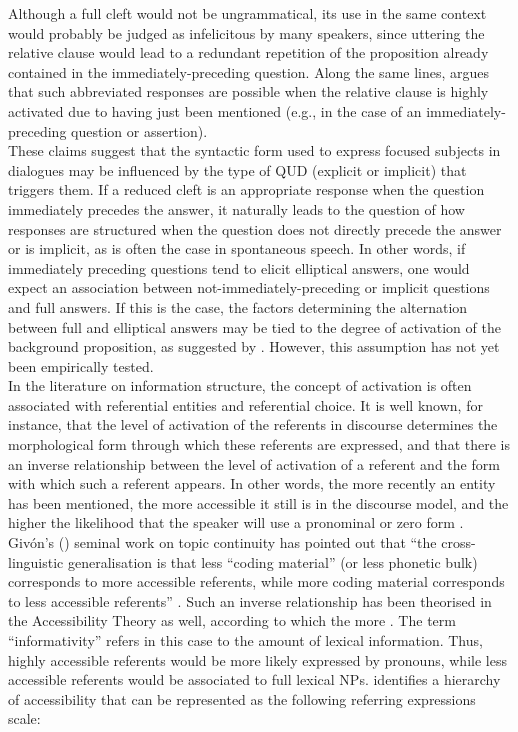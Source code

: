 Although a full cleft would not be ungrammatical, its use in the same context would probably be judged as infelicitous by many speakers, since uttering the relative clause would lead to a redundant repetition of the proposition already contained in the immediately-preceding question. Along the same lines, \textcite{katz2000categories} argues that such abbreviated responses are possible when the relative clause is highly activated due to having just been mentioned (e.g., in the case of an immediately-preceding question or assertion). \\
These claims suggest that the syntactic form used to express focused subjects in dialogues may be influenced by the type of QUD (explicit or implicit) that triggers them. If a reduced cleft is an appropriate response when the question immediately precedes the answer, it naturally leads to the question of how responses are structured when the question does not directly precede the answer or is implicit, as is often the case in spontaneous speech. In other words, if immediately preceding questions tend to elicit elliptical answers, one would expect an association between not-immediately-preceding or implicit questions and full answers.
If this is the case, the factors determining the alternation between full and elliptical answers may be tied to the degree of activation of the background proposition, as suggested by \textcite{katz2000categories}. However, this assumption has not yet been empirically tested. \\
 In the literature on information structure, the concept of activation is often associated with referential entities and referential choice. It is well known, for instance, that the level of activation of the referents in discourse determines the morphological form through which these referents are expressed, and that there is an inverse relationship between the level of activation of a referent and the form with which  such a referent appears.  In other words, the more recently an entity has been mentioned, the more accessible it still is in the discourse model, and the higher the likelihood that the speaker will use a pronominal or zero form \parencite{givon1983topic}. Givón’s (\citeyear{givon1983topic}) seminal work on topic continuity has pointed out that ``the cross-linguistic generalisation is that less “coding material” (or less phonetic bulk) corresponds to more accessible referents, while more coding material corresponds to less accessible referents” \parencite[18]{givon1983topic}. 
Such an inverse relationship has been theorised in the Accessibility Theory \parencite{ariel1988referring} as well, according to which the more  \parencite[32]{ariel2001accessibility}. The term ``informativity” refers in this case to the amount of lexical information. Thus, highly accessible referents would be more likely expressed by pronouns, while less accessible referents would be associated to full lexical NPs. \textcite{ariel2001accessibility} identifies a hierarchy of accessibility that can be represented as the following referring expressions scale:


